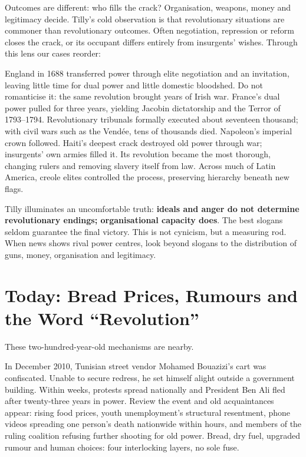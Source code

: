 Outcomes are different: who fills the crack? Organisation, weapons, money and legitimacy decide. Tilly's cold observation is that revolutionary situations are commoner than revolutionary outcomes. Often negotiation, repression or reform closes the crack, or its occupant differs entirely from insurgents' wishes. Through this lens our cases reorder:

England in 1688 transferred power through elite negotiation and an invitation, leaving little time for dual power and little domestic bloodshed. Do not romanticise it: the same revolution brought years of Irish war. France's dual power pulled for three years, yielding Jacobin dictatorship and the Terror of 1793--1794. Revolutionary tribunals formally executed about seventeen thousand; with civil wars such as the Vendée, tens of thousands died. Napoleon's imperial crown followed. Haiti's deepest crack destroyed old power through war; insurgents' own armies filled it. Its revolution became the most thorough, changing rulers and removing slavery itself from law. Across much of Latin America, creole elites controlled the process, preserving hierarchy beneath new flags.

Tilly illuminates an uncomfortable truth: \textbf{ideals and anger do not determine revolutionary endings; organisational capacity does}. The best slogans seldom guarantee the final victory. This is not cynicism, but a measuring rod. When news shows rival power centres, look beyond slogans to the distribution of guns, money, organisation and legitimacy.

\section[Bread, Rumours and Revolution Today]{Today: Bread Prices, Rumours and the Word ``Revolution''}
These two-hundred-year-old mechanisms are nearby.

In December 2010, Tunisian street vendor Mohamed Bouazizi's cart was confiscated. Unable to secure redress, he set himself alight outside a government building. Within weeks, protests spread nationally and President Ben Ali fled after twenty-three years in power. Review the event and old acquaintances appear: rising food prices, youth unemployment's structural resentment, phone videos spreading one person's death nationwide within hours, and members of the ruling coalition refusing further shooting for old power. Bread, dry fuel, upgraded rumour and human choices: four interlocking layers, no sole fuse.

